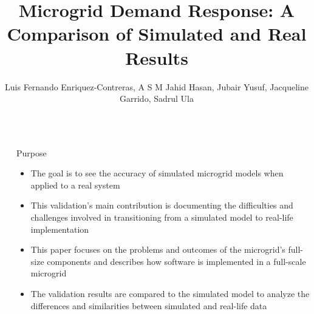 \documentclass[final, 20 pt]{beamer}
\title{Microgrid Demand Response: A Comparison of Simulated and Real Results} %
\author{Luis Fernando Enriquez-Contreras, A S M Jahid Hasan,  Jubair Yusuf, Jacqueline Garrido, Sadrul Ula} %
\institute{Department of Electrical and Computer Engineering  \\ University of California, Riverside} %
\newlength{\sepwid}
\newlength{\onecolwid}
\begin{document}

\setlength{\belowcaptionskip}{2ex} %
\setlength\belowdisplayshortskip{2ex} %

\begin{frame}[t] %

\begin{columns}[t] %

\begin{column}{\sepwid}\end{column} %

\begin{column}{\onecolwid} %


\begin{alertblock}{Purpose}

\begin{itemize}
	\item The goal is to see the accuracy of simulated microgrid models when applied to a real system
	\item This validation's main contribution is documenting the difficulties and challenges involved in transitioning from a simulated model to real-life implementation
	\item This paper focuses on the problems and outcomes of the microgrid's full-size components and describes how software is implemented in a full-scale microgrid
	\item The validation results are compared to the simulated model to analyze the differences and similarities between simulated and real-life data
\end{itemize}

\end{alertblock}



\end{column}
\end{columns}
\end{frame}
\end{document}
